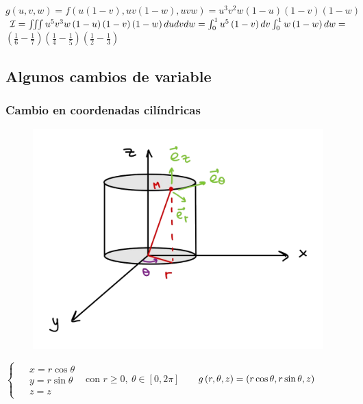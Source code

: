 \documentclass{report}
\begin{document}
{      \vspace{0.2cm}$g\left(u,v,w\right)=f\left(u\left(1-v\right),uv\left(1-w\right),uvw\right)=u^3v^2w\left(1-u\right)\left(1-v\right)\left(1-w\right)$\\

      \vspace{0.2cm}$\mathcal{I}=\iiint u^5v^3w\left(1-u\right)\left(1-v\right)\left(1-w\right)dudvdw=\int_{0}^{1}u^5\left(1-v\right)dv\int_{0}^{1}w\left(1-w\right)dw=$
      $\left(\frac16-\frac17\right)\left(\frac14-\frac15\right)\left(\frac12-\frac13\right)$
    }
    \subsection{Algunos cambios de variable}
      \subsubsection{Cambio en coordenadas cilíndricas}
        \vspace{0.2cm}
        \begin{figure}
            \vspace{-1.4cm}
            \begin{center}
                \includegraphics[width=.35\textwidth]{mireia3.png}
            \end{center}
        \end{figure}
        $\begin{cases}\begin{aligned} &x=r\cos\theta\\ &y=r\sin\theta\\ &z=z\end{aligned}\end{cases}$ con $r\geq 0,\ \theta\in\left[0,2\pi\right]$
        $\hspace{0.5cm}g\left(r,\theta,z\right)=\left(r\cos\theta,r\sin\theta,z\right)$\\
        
\end{document}
